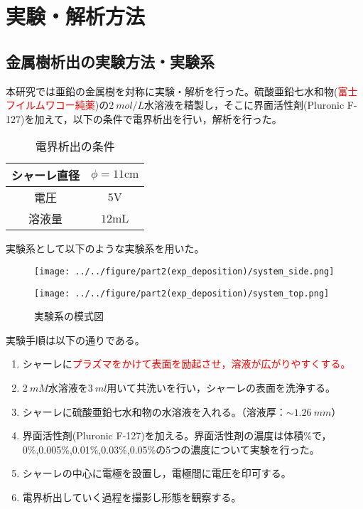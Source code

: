 \documentclass[autodetect-engine,dvi=dvipdfmx,a4paper,ja=standard,oneside,openany,11pt,draft]{bxjsbook}
\begin{document}
\section{実験・解析方法}
\subsection{金属樹析出の実験方法・実験系}
本研究では亜鉛の金属樹を対称に実験・解析を行った。硫酸亜鉛七水和物(\textcolor{red}{富士フイルムワコー純薬})の$\SI{2}{mol/L}$水溶液を精製し，そこに界面活性剤(Pluronic F-127)を加えて，以下の条件で電界析出を行い，解析を行った。
\begin{table}[H]
  \centering
  \caption{電界析出の条件}
  \begin{tabular}{c||c}
    \hline
    シャーレ直径 & $\phi = 11 \si{\cm}$ \\ \hline
    電圧     & $5 \si{\V}$          \\ \hline
    溶液量    & $12 \si{\mL}$        \\
    \hline
  \end{tabular}
\end{table}
実験系として以下のような実験系を用いた。
\begin{figure}[H]
  \begin{minipage}
    {0.65\textwidth}
    \centering
    \texttt{[image: ../../figure/part2(exp\_deposition)/system\_side.png]}
    \label{fig:el_dep_mol}
  \end{minipage}
  \begin{minipage}
    {0.32\textwidth}
    \centering
    \texttt{[image: ../../figure/part2(exp\_deposition)/system\_top.png]}
    \label{fig:el_dep_fractal}
  \end{minipage}
  \caption{実験系の模式図}
\end{figure}
実験手順は以下の通りである。
\begin{enumerate}
  \item シャーレに\textcolor{red}{プラズマをかけて表面を励起させ，溶液が広がりやすくする。}
  \item {}$\SI{2}{mM}$水溶液を$\SI{3}{ml}$用いて共洗いを行い，シャーレの表面を洗浄する。
  \item シャーレに硫酸亜鉛七水和物の水溶液を入れる。（溶液厚：$\sim\SI{1.26}{mm}$）
  \item 界面活性剤(Pluronic F-127)を加える。界面活性剤の濃度は体積\%で，0\%,0.005\%,0.01\%,0.03\%,0.05\%の5つの濃度について実験を行った。
  \item シャーレの中心に電極を設置し，電極間に電圧を印可する。
  \item 電界析出していく過程を撮影し形態を観察する。
\end{enumerate}
\end{document}
